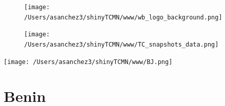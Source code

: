 \documentclass{article}\usepackage[]{graphicx}\usepackage[]{color}
\begin{document}
%

\begin{figure}
  \vspace{-3ex} %
  \hspace{-7ex} %
  \texttt{[image: /Users/asanchez3/shinyTCMN/www/wb\_logo\_background.png]}
\end{figure}
\begin{figure}
  \begin{minipage}[t]{0.99\textwidth} %
      \vspace{-30ex}
      \hspace{-2ex}
      \raggedright{\texttt{[image: /Users/asanchez3/shinyTCMN/www/TC\_snapshots\_data.png]}}
  \end{minipage}
\end{figure}
%
\begin{minipage}[t]{0.99\textwidth} %
  \vspace{-1.5cm}
  \begin{minipage}[c]{0.36\textwidth} 
    \begin{minipage}[c]{0.28\textwidth} %
      \texttt{[image: /Users/asanchez3/shinyTCMN/www/BJ.png]}
    \end{minipage}
    \begin{minipage}[c]{0.70\textwidth} %
      \section*{\color{blue!40!black}Benin}
    \end{minipage}
  \end{minipage}
  \begin{minipage}[c]{0.63\textwidth} %
    \centering
  \end{minipage}  
\end{minipage} %
\end{document}
